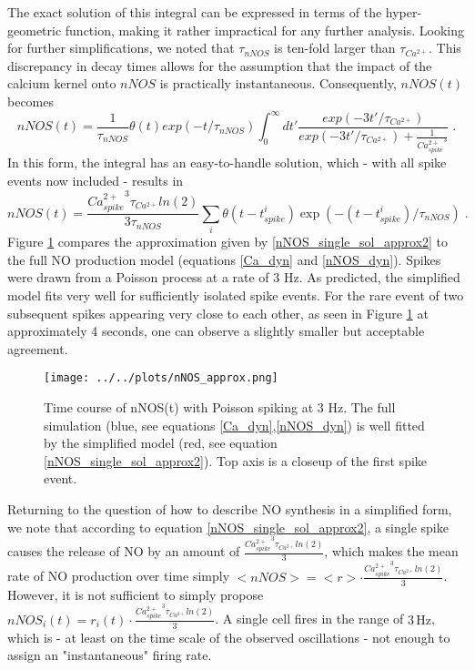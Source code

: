 \documentclass[10pt,a4paper]{article}
\begin{document}
The exact solution of this integral can be expressed in terms of the hyper-geometric function, making it rather impractical for any further analysis. Looking for further simplifications, we noted that $\tau_{nNOS}$ is ten-fold larger than $\tau_{Ca^{2+}}$. This discrepancy in decay times allows for the assumption that the impact of the calcium kernel onto $nNOS$ is practically instantaneous. Consequently, $nNOS(t)$ becomes
\begin{equation}
nNOS(t) = \frac{1}{\tau_{nNOS}} \theta(t) exp(-t/\tau_{nNOS}) \int_{0}^\infty dt' \frac{exp(-3t'/\tau_{Ca^{2+}})}{exp(-3t'/\tau_{Ca^{2+}}) + \frac{1}{{Ca^{2+}_{spike}}^3}}\;.
\label{nNOS_single_sol_approx1}
\end{equation}
In this form, the integral has an easy-to-handle solution, which - with all spike events now included - results in
\begin{equation}
nNOS(t) = \frac{{Ca^{2+}_{spike}}^3 \tau_{Ca^{2+}}ln(2)}{3\tau_{nNOS}} \sum_i \theta(t-t^i_{spike}) \exp(-(t-t^i_{spike})/\tau_{nNOS})\;.
\label{nNOS_single_sol_approx2}
\end{equation}
Figure \ref{nNOS_approx_plot} compares the approximation given by \eqref{nNOS_single_sol_approx2} to the full NO production model (equations \eqref{Ca_dyn} and \eqref{nNOS_dyn}). Spikes were drawn from a Poisson process at a rate of 3 Hz. As predicted, the simplified model fits very well for sufficiently isolated spike events. For the rare event of two subsequent spikes appearing very close to each other, as seen in Figure \ref{nNOS_approx_plot} at approximately 4 seconds, one can observe a slightly smaller but acceptable agreement.
\begin{figure}
\texttt{[image: ../../plots/nNOS\_approx.png]}
\caption{Time course of nNOS(t) with Poisson spiking at 3 Hz. The full simulation (blue, see equations \eqref{Ca_dyn},\eqref{nNOS_dyn}) is well fitted by the simplified model (red, see equation \eqref{nNOS_single_sol_approx2}). Top axis is a closeup of the first spike event.}
\label{nNOS_approx_plot}
\end{figure}

Returning to the question of how to describe NO synthesis in a simplified form, we note that according to equation \eqref{nNOS_single_sol_approx2}, a single spike causes the release of NO by an amount of $\frac{{Ca^{2+}_{spike}}^3 \tau_{Ca^{2+}}ln(2)}{3}$, which makes the mean rate of NO production over time simply $<nNOS> = <r> \cdot \frac{{Ca^{2+}_{spike}}^3 \tau_{Ca^{2+}}ln(2)}{3}$. However, it is not sufficient to simply propose $nNOS_i(t) = r_i(t) \cdot \frac{{Ca^{2+}_{spike}}^3 \tau_{Ca^{2+}}ln(2)}{3}$. A single cell fires in the range of $\mathrm{3\,Hz}$, which is - at least on the time scale of the observed oscillations - not enough to assign an "instantaneous" firing rate.
\end{document}
